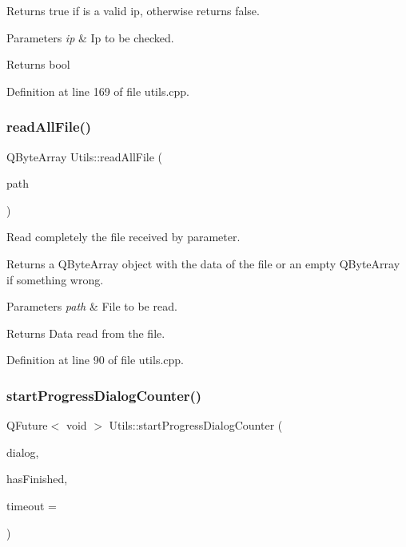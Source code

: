 Returns true if is a valid ip, otherwise returns false. 


\begin{DoxyParams}{Parameters}
{\em ip} & Ip to be checked. \\
\hline
\end{DoxyParams}
\begin{DoxyReturn}{Returns}
bool 
\end{DoxyReturn}


Definition at line 169 of file utils.\+cpp.

\mbox{\label{classUtils_a8ab4445ab51c372f969d3088ef0b73d9}} 
\subsubsection{\texorpdfstring{read\+All\+File()}{readAllFile()}}
{\footnotesize\ttfamily Q\+Byte\+Array Utils\+::read\+All\+File (\begin{DoxyParamCaption}\item[{const Q\+String \&}]{path }\end{DoxyParamCaption})\hspace{0.3cm}{\ttfamily [static]}}



Read completely the file received by parameter. 

Returns a Q\+Byte\+Array object with the data of the file or an empty Q\+Byte\+Array if something wrong. 
\begin{DoxyParams}{Parameters}
{\em path} & File to be read. \\
\hline
\end{DoxyParams}
\begin{DoxyReturn}{Returns}
Data read from the file. 
\end{DoxyReturn}


Definition at line 90 of file utils.\+cpp.

\mbox{\label{classUtils_a12f3c653e90f7ed38287f0a8897f60d5}} 
\subsubsection{\texorpdfstring{start\+Progress\+Dialog\+Counter()}{startProgressDialogCounter()}}
{\footnotesize\ttfamily Q\+Future$<$ void $>$ Utils\+::start\+Progress\+Dialog\+Counter (\begin{DoxyParamCaption}\item[{Q\+Progress\+Dialog $\ast$}]{dialog,  }\item[{bool $\ast$}]{has\+Finished,  }\item[{int}]{timeout = {} }\end{DoxyParamCaption})\hspace{0.3cm}{\ttfamily [static]}}



